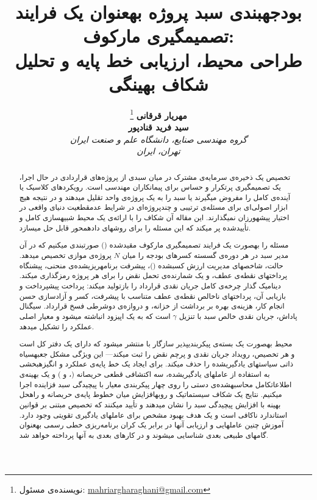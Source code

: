 \documentclass[12pt,a4paper]{article}
\title{%
  {\titlefont\bfseries\large
   بودجه\zwnj{}بندی سبد پروژه به\zwnj{}عنوان یک فرایند تصمیم\zwnj{}گیری مارکوف:\\[4pt]
   طراحی محیط، ارزیابی خط پایه و تحلیل شکاف بهینگی%
  }
}
\author{%
  \begin{tabular}{c}
    {\headingfont\bfseries مهریار قرقانی}%
      \thanks{نویسنده‌ی مسئول:
        \href{mailto:mahriargharaghani@gmail.com}{mahriargharaghani@gmail.com}} \\[2pt]
    {\headingfont\bfseries سید فرید قنادپور} \\[6pt]
    {\itshape\small
      گروه مهندسی صنایع، دانشگاه علم و صنعت ایران} \\
    {\itshape\small تهران، ایران}
  \end{tabular}
}
\date{}
\theoremstyle{definition}
\theoremstyle{remark}
\begin{document}
\maketitle


\begin{abstract}

تخصیص یک ذخیره‌ی سرمایه‌ی مشترک در میان سبدی از پروژه‌های قراردادی در حال اجرا،
یک تصمیم\zwnj{}گیری پرتکرار و حساس برای پیمانکاران مهندسی است.
رویکردهای کلاسیک یا آینده‌ی کامل را مفروض می\zwnj{}گیرند یا سبد را به یک پروژه‌ی واحد
تقلیل می\zwnj{}دهند و در نتیجه هیچ ابزار اصولی‌ای برای مسئله‌ی ترتیبی و چندپروژه‌ای
در شرایط عدم\zwnj{}قطعیت دنیای واقعی در اختیار پیشه\zwnj{}ورزان نمی\zwnj{}گذارند.
این مقاله آن شکاف را با ارائه‌ی یک محیط شبیه\zwnj{}سازی کامل و تأییدشده
پر می\zwnj{}کند که این مسئله را برای روش\zwnj{}های داده\zwnj{}محور قابل حل می\zwnj{}سازد.

مسئله را به\zwnj{}صورت یک فرایند تصمیم\zwnj{}گیری مارکوف مقیدشده () صورت\zwnj{}بندی
می\zwnj{}کنیم که در آن مدیر سبد در هر دوره‌ی گسسته کسرهای بودجه را میان
$N$ پروژه‌ی موازی تخصیص می\zwnj{}دهد.
حالت، شاخص\zwnj{}های مدیریت ارزش کسب\zwnj{}شده ()،
پیشرفت برنامه\zwnj{}ریزی\zwnj{}شده‌ی منحنی،
پیش\zwnj{}نگاه پرداخت\zwnj{}های نقطه‌ی عطف، و یک شمارنده‌ی تحمل نقض
را برای هر پروژه رمزگذاری می\zwnj{}کند.
دینامیک گذار چرخه‌ی کامل جریان نقدی قرارداد
 را بازتولید می\zwnj{}کند:
پرداخت پیش\zwnj{}پرداخت و بازیابی آن، پرداخت\zwnj{}های ناخالص نقطه‌ی عطف
متناسب با پیشرفت، کسر و آزادسازی حسن انجام کار،
هزینه‌ی بهره بر برداشت از خزانه، و دروازه‌ی دوشرطی فسخ قرارداد.
سیگنال پاداش، جریان نقدی خالص سبد با تنزیل $\gamma$ است که
به  یک اپیزود انباشته می\zwnj{}شود و معیار اصلی عملکرد را تشکیل می\zwnj{}دهد.

محیط به\zwnj{}صورت یک بسته‌ی پیکربندی\zwnj{}پذیر سازگار با 
منتشر می\zwnj{}شود که دارای یک دفتر کل  است
و هر تخصیص، رویداد جریان نقدی و پرچم نقض را ثبت می\zwnj{}کند—
این ویژگی مشکل جعبه\zwnj{}سیاه ذاتی سیاست\zwnj{}های یادگیری\zwnj{}شده را حذف می\zwnj{}کند.
برای ایجاد یک خط پایه‌ی عملکرد و انگیزه\zwnj{}بخشی به
استفاده از عامل\zwnj{}های یادگیری\zwnj{}شده،
سه اکتشافی قطعی حریصانه (،  و )
و یک بهینه‌ی اطلاعات\zwnj{}کامل محاسبه\zwnj{}شده‌ی دستی را
روی چهار پیکربندی معیار با پیچیدگی سبد فزاینده اجرا می\zwnj{}کنیم.
نتایج یک شکاف سیستماتیک و روبه\zwnj{}افزایش میان خطوط پایه‌ی حریصانه
و راه\zwnj{}حل بهینه با افزایش پیچیدگی سبد را نشان می\zwnj{}دهند
و تأیید می\zwnj{}کنند که تخصیص مبتنی بر قوانین استاندارد ناکافی است
و یک هدف بهبود مشخص برای عامل\zwnj{}های یادگیری تقویتی وجود دارد.
آموزش چنین عامل\zwnj{}هایی و ارزیابی آن\zwnj{}ها در برابر یک کران
برنامه‌ریزی خطی رسمی به\zwnj{}عنوان گام\zwnj{}های طبیعی بعدی
شناسایی می\zwnj{}شوند و در کارهای بعدی به آن\zwnj{}ها پرداخته خواهد شد.


\end{abstract}
\end{document}
